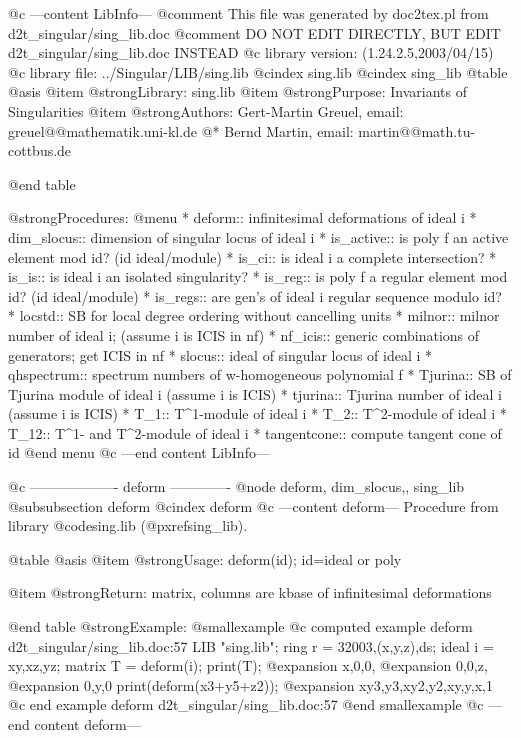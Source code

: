 @c ---content LibInfo---
@comment This file was generated by doc2tex.pl from d2t_singular/sing_lib.doc
@comment DO NOT EDIT DIRECTLY, BUT EDIT d2t_singular/sing_lib.doc INSTEAD
@c library version: (1.24.2.5,2003/04/15)
@c library file: ../Singular/LIB/sing.lib
@cindex sing.lib
@cindex sing_lib
@table @asis
@item @strong{Library:}
sing.lib
@item @strong{Purpose:}
      Invariants of Singularities
@item @strong{Authors:}
Gert-Martin Greuel, email: greuel@@mathematik.uni-kl.de @*
Bernd Martin, email: martin@@math.tu-cottbus.de

@end table

@strong{Procedures:}
@menu
* deform:: infinitesimal deformations of ideal i
* dim_slocus:: dimension of singular locus of ideal i
* is_active:: is poly f an active element mod id? (id ideal/module)
* is_ci:: is ideal i a complete intersection?
* is_is:: is ideal i an isolated singularity?
* is_reg:: is poly f a regular element mod id? (id ideal/module)
* is_regs:: are gen's of ideal i regular sequence modulo id?
* locstd:: SB for local degree ordering without cancelling units
* milnor:: milnor number of ideal i; (assume i is ICIS in nf)
* nf_icis:: generic combinations of generators; get ICIS in nf
* slocus:: ideal of singular locus of ideal i
* qhspectrum:: spectrum numbers of w-homogeneous polynomial f
* Tjurina:: SB of Tjurina module of ideal i (assume i is ICIS)
* tjurina:: Tjurina number of ideal i (assume i is ICIS)
* T_1:: T^1-module of ideal i
* T_2:: T^2-module of ideal i
* T_12:: T^1- and T^2-module of ideal i
* tangentcone:: compute tangent cone of id
@end menu
@c ---end content LibInfo---

@c ------------------- deform -------------
@node deform, dim_slocus,, sing_lib
@subsubsection deform
@cindex deform
@c ---content deform---
Procedure from library @code{sing.lib} (@pxref{sing_lib}).

@table @asis
@item @strong{Usage:}
deform(id); id=ideal or poly

@item @strong{Return:}
matrix, columns are kbase of infinitesimal deformations

@end table
@strong{Example:}
@smallexample
@c computed example deform d2t_singular/sing_lib.doc:57 
LIB "sing.lib";
ring r   = 32003,(x,y,z),ds;
ideal i  = xy,xz,yz;
matrix T = deform(i);
print(T);
@expansion{} x,0,0,
@expansion{} 0,0,z,
@expansion{} 0,y,0 
print(deform(x3+y5+z2));
@expansion{} xy3,y3,xy2,y2,xy,y,x,1
@c end example deform d2t_singular/sing_lib.doc:57
@end smallexample
@c ---end content deform---

